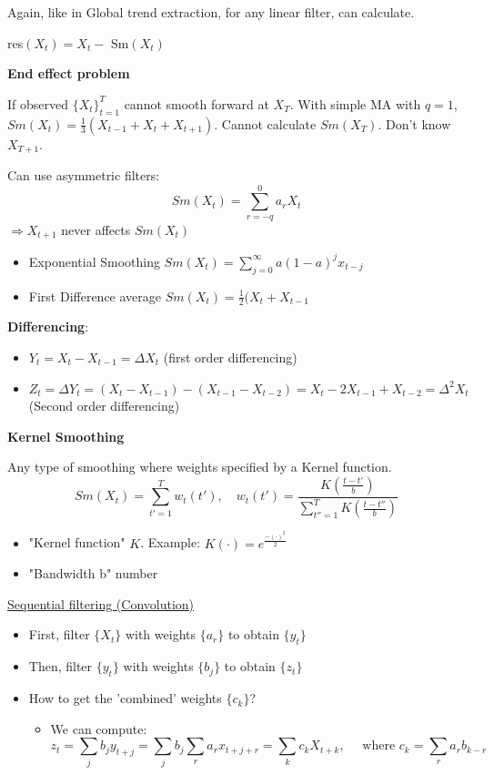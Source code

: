 Again, like in Global trend extraction, for any linear filter, can calculate.
\begin{mdframed}
\centering
res$(X_t)=X_t-$ Sm$(X_t)$
\end{mdframed}

\bigskip

\textbf{End effect problem}

\bigskip
If observed $ \{X_t\}_{t=1}^T $ cannot smooth forward at $X_T$. With simple MA with $q=1$, $Sm(X_t)=\frac{1}{3}(X_{t-1}+X_t+X_{t+1})$. Cannot calculate $Sm(X_T)$. Don't know $X_{T+1}$.

Can use asymmetric filters:
$$Sm(X_t)=\sum_{r=-q}^0 a_r X_t$$
$\Rightarrow X_{t+1}$ never affects $Sm(X_t)$
\begin{itemize}
    \item Exponential Smoothing $Sm(X_t)=\sum_{j=0}^\infty a(1-a)^j x_{t-j}$
    \item First Difference average $Sm(X_t)=\frac{1}{2}(X_t+X_{t-1}$
\end{itemize}


\textbf{Differencing}:
\begin{itemize}
    \item $Y_t =X_t-X_{t-1} = \Delta X_t$ (first order differencing)
    \item $Z_t=\Delta Y_t= (X_t-X_{t-1})-(X_{t-1}-X_{t-2})=X_t-2X_{t-1}+X_{t-2}=\Delta^2X_t$ (Second order differencing)
\end{itemize}

\textbf{Kernel Smoothing}

\bigskip

Any type of smoothing where weights specified by a Kernel function. 
$$Sm(X_t)=\sum_{t'=1}^T w_t(t'), \quad w_t(t')= \frac{K\left(\frac{t-t'}{b} \right)}{\sum_{t''=1}^T K\left( \frac{t-t''}{b}\right)}$$

\begin{itemize}
    \item "Kernel function" $K$. \quad Example: $K(\cdot)=e^{\frac{-(\cdot)^2}{2}}$
    \item "Bandwidth b" number 
\end{itemize}

\bigskip

\underline{Sequential filtering (Convolution)}

\bigskip

\begin{itemize}
    \item First, filter $\{X_t\}$ with weights $\{a_r\}$ to obtain $\{y_t\}$
    \item Then, filter $\{y_t\}$ with weights $\{b_j\}$ to obtain $\{z_t\}$
    \item How to get the 'combined' weights $\{c_k\}$?
        \begin{itemize}
            \item We can compute:
            \[
            z_t=\sum_j b_j y_{t+j}=\sum_jb_j \sum_r a_r x_{t+j+r} = \sum_k c_k X_{t+k}, \quad \text{ where } c_k=\sum_r a_r b_{k-r}
            \]
        \end{itemize}
\end{itemize}

